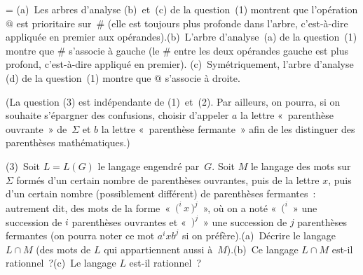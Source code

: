 \documentclass[12pt,a4paper]{article}
\theoremstyle{definition}
\newif\ifcorrige
\newenvironment{corrige}%
{\ifcorrige\relax\else\setbox0=\vbox\bgroup\fi%
\smallbreak\footnotesize\noindent{\underbar{\textit{Corrigé.}}\quad}}
{{\hbox{}\nobreak\hfill\checkmark}%
\ifcorrige\relax\else\egroup\fi\par}
\begin{document}
\begin{corrige}
(a) Les arbres d'analyse (b) et (c) de la question (1) montrent que
  l'opération $@$ est prioritaire sur $\#$ (elle est toujours plus
  profonde dans l'arbre, c'est-à-dire appliquée en premier aux
  opérandes).\quad (b) L'arbre d'analyse (a) de la question (1) montre
  que $\#$ s'associe à gauche (le $\#$ entre les deux opérandes gauche
  est plus profond, c'est-à-dire appliqué en premier).\quad
  (c) Symétriquement, l'arbre d'analyse (d) de la question (1) montre
  que $@$ s'associe à droite.
\end{corrige}

\smallskip

(La question (3) est indépendante de (1) et (2).  Par ailleurs, on
pourra, si on souhaite s'épargner des confusions, choisir d'appeler
$a$ la lettre « parenthèse ouvrante » de $\Sigma$ et $b$ la lettre
« parenthèse fermante » afin de les distinguer des parenthèses
mathématiques.)

(3) Soit $L = L(G)$ le langage engendré par $G$.  Soit $M$ le langage
des mots sur $\Sigma$ formés d'un certain nombre de parenthèses
ouvrantes, puis de la lettre $x$, puis d'un certain nombre
(possiblement différent) de parenthèses fermantes : autrement dit, des
mots de la forme « ${(}^i\, x\, {)}^j$ », où on a noté « ${(}^i$ » une
succession de $i$ parenthèses ouvrantes et « ${)}^j$ » une succession
de $j$ parenthèses fermantes (on pourra noter ce mot $a^i x b^j$ si on
préfère).\quad (a) Décrire le langage $L\cap M$ (des mots de $L$ qui
appartiennent aussi à $M$).\quad (b) Ce langage $L\cap M$ est-il
rationnel ?\quad (c) Le langage $L$ est-il rationnel ?
\end{document}
